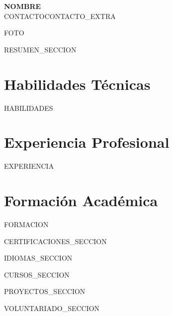 \documentclass[9pt,a4paper]{article}
\begin{document}
\begin{minipage}[c]{0.65\textwidth}
  \centering
  {\fontsize{18}{22}\selectfont \textbf{{{NOMBRE}}}} \\[2pt]
  {\normalsize {{CONTACTO}}{{CONTACTO_EXTRA}}}
\end{minipage}%
\begin{minipage}[c]{0.35\textwidth}
  \raggedleft
  {{FOTO}}
\end{minipage}

\vspace{4pt}

{{RESUMEN_SECCION}}

\section*{Habilidades Técnicas}
{{HABILIDADES}}

\vspace{1pt}

\section*{Experiencia Profesional}
{{EXPERIENCIA}}

\vspace{1pt}

\section*{Formación Académica}
{{FORMACION}}

\vspace{1pt}

{{CERTIFICACIONES_SECCION}}

{{IDIOMAS_SECCION}}

{{CURSOS_SECCION}}

{{PROYECTOS_SECCION}}

{{VOLUNTARIADO_SECCION}}
\end{document}
